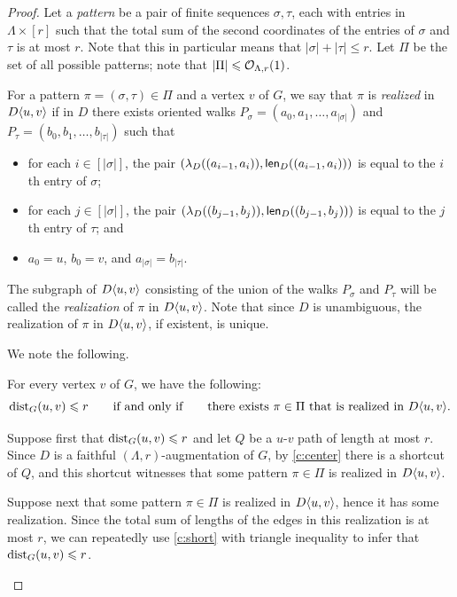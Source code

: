 \begin{proof}
	Let a \emph{pattern} be a pair of finite sequences $\sigma,\tau$, each with entries in $\Lambda\times [r]$ such that the total sum of the second coordinates of the entries of $\sigma$ and $\tau$ is at most $r$. Note that this in particular means that $|\sigma|+|\tau|\leq r$. Let $\Pi$ be the set of all possible patterns; note that $|\Pi|\leqslant \mathcal{O}_{\Lambda,r}(1)$.
	
	For a pattern $\pi=(\sigma,\tau)\in \Pi$ and a vertex $v$ of $G$, we say that $\pi$ is \emph{realized} in $D\langle u,v\rangle$ if in $D$ there exists oriented walks $P_\sigma=(a_0,a_1,\ldots,a_{|\sigma|})$ and $P_\tau=(b_0,b_1,\ldots,b_{|\tau|})$ such that
	\begin{itemize}
		\item for each $i\in [|\sigma|]$, the pair $(\lambda_D((a_{i-1},a_i)),\mathsf{len}_D((a_{i-1},a_i)))$ is equal to the $i$th entry of $\sigma$;
		\item for each $j\in [|\sigma|]$, the pair $(\lambda_D((b_{j-1},b_j)),\mathsf{len}_D((b_{j-1},b_j)))$ is equal to the $j$th entry of $\tau$; and
		\item $a_0=u$, $b_0=v$, and $a_{|\sigma|}=b_{|\tau|}$. %
	\end{itemize}
	The subgraph of $D\langle u,v\rangle$ consisting of the union of the walks $P_\sigma$ and $P_\tau$ will be called the \emph{realization} of $\pi$ in $D\langle u,v\rangle$. Note that since $D$ is unambiguous, the realization of $\pi$ in $D\langle u,v\rangle$, if existent, is unique.
	
	We note the following.
	
	\begin{claim}\label{cl:dist-pattern}
		For every vertex $v$ of $G$, we have the following:
		\[\mathrm{dist}_G(u,v)\leqslant r \qquad\textrm{if and only if}\qquad \textrm{there exists }\pi\in \Pi\textrm{ that is realized in }D\langle u,v\rangle.\]
	\end{claim}
	\begin{claimproof}
		Suppose first that $\mathrm{dist}_G(u,v)\leqslant r$ and let $Q$ be a $u$-$v$ path of length at most $r$. Since $D$ is a faithful $(\Lambda,r)$-augmentation of $G$, by \ref{c:center} there is a shortcut of $Q$, and this shortcut witnesses that some pattern $\pi\in \Pi$ is realized in $D\langle u,v\rangle$.
		
		Suppose next that some pattern $\pi\in \Pi$ is realized in $D\langle u,v\rangle$, hence it has some realization. Since the total sum of lengths of the edges in this realization is at most $r$, we can repeatedly use \ref{c:short} with triangle inequality to infer that $\mathrm{dist}_G(u,v)\leqslant r$.
	\end{claimproof}
	

\end{proof}
